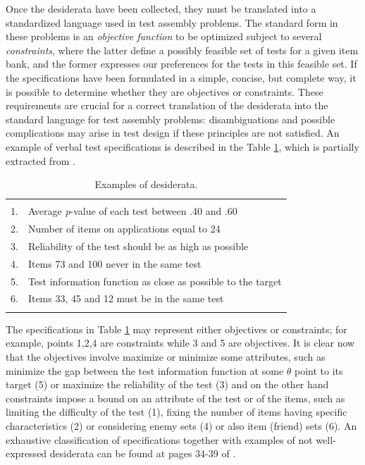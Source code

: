 Once the desiderata have been collected, they must be translated into a standardized language used in test assembly problems. The standard form in these problems is an \textit{objective function} to be optimized subject to several \textit{constraints}, where the latter define a possibly feasible set of tests for a given item bank, and the former expresses our preferences for the tests in this feasible set. If the specifications have been formulated in a simple, concise, but complete way, it is possible to determine whether they are objectives or constraints. These requirements are crucial for a correct translation of the desiderata into the standard language for test assembly problems: disambiguations and possible complications may arise in test design if these principles are not satisfied. An example of verbal test specifications is described in the Table \ref{tab:exspec}, which is partially extracted from \textcite{VDL2005}.
\begin{table}[H]
	\centering
	\begin{tabular}{|ll|}
		\hline & \\
		1. & Average \textit{p}-value of each test between .40 and .60 \\
		2. & Number of items on applications equal to 24 \\
		3. & Reliability of the test should be as high as possible \\
		4. & Items 73 and 100 never in the same test \\
		5. & Test information function as close as possible to the target \\
		6. & Items 33, 45 and 12 must be in the same test \\
		& \\
		\hline
	\end{tabular}
	\caption{Examples of desiderata.}\label{tab:exspec}
\end{table}

The specifications in Table \ref{tab:exspec} may represent either objectives or constraints; for example, points 1,2,4 are constraints while 3 and 5 are objectives. It is clear now that the objectives involve maximize or minimize some attributes, such as minimize the gap between the test information function at some $\theta$ point to its target (5) or maximize the reliability of the test (3) and on the other hand constraints impose a bound on an attribute of the test or of the items, such as limiting the difficulty of the test (1), fixing the number of items having specific characteristics (2) or considering enemy sets (4) or also item (friend) sets (6). An exhaustive classification of specifications together with examples of not well-expressed desiderata can be found at pages 34-39 of \textcite{VDL2005}.

